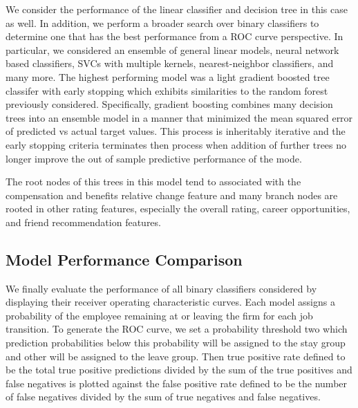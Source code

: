 \documentclass[10pt]{article}
\begin{document}
We consider the performance of the linear classifier and decision tree in this 
case as well. In addition, we perform a broader search over binary classifiers to 
determine one that has the best performance from a ROC curve perspective. 
In particular, we considered an ensemble of general linear models, neural network based 
classifiers, SVCs with multiple kernels, nearest-neighbor classifiers, and many more.
The highest performing model was a light gradient boosted tree classifer with 
early stopping which exhibits similarities to the random forest 
previously considered.  Specifically, gradient boosting combines many decision 
trees into an ensemble model in a manner that minimized the mean squared 
error of predicted vs actual target values.  This process is inheritably iterative 
and the early stopping criteria terminates then process when addition of 
further trees no longer improve the out of sample predictive performance of the mode.

The root nodes of this trees in this model tend to associated with the 
compensation and benefits relative change feature and many branch nodes 
are rooted in other rating features, especially the overall rating, 
career opportunities, and friend recommendation features.

\subsection{Model Performance Comparison}

We finally evaluate the performance of all binary classifiers considered by displaying their 
receiver operating characteristic curves.  Each model assigns a probability of the employee 
remaining at or leaving the firm for each job transition.  To generate the ROC curve, 
we set a probability threshold two which prediction probabilities below this probability 
will be assigned to the stay group and other will be assigned to the leave group.  
Then true positive rate defined to be the total true positive predictions divided 
by the sum of the true positives and false negatives is plotted against the 
false positive rate defined to be the number of false negatives divided by the 
sum of true negatives and false negatives.
\end{document}
